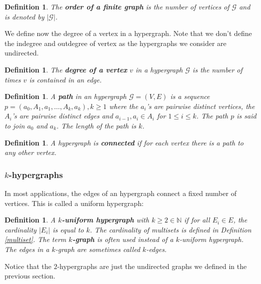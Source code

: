 \documentclass[a4paper,11pt]{report}
\newtheorem{definition}[theorem]{Definition}
\newcommand{\N}{{\mathbb N}}
\newcommand{\hgraf}{\mathcal{G}}
\begin{document}
\begin{definition}
  The \textbf{order of a finite graph \hgraf} is the number of vertices of $\hgraf$ 
  and is denoted by $|\hgraf|$.
\end{definition}
We define now the degree of a vertex in a hypergraph. Note that we don't define 
the indegree and outdegree of vertex as the hypergraphs we consider are 
undirected.
\begin{definition}
The \textbf{degree of a vertex} $v$ in a hypergraph $\hgraf$ is the number of 
times $v$ is contained in an edge.
\end{definition}

\begin{definition}
A \textbf{path} in an hypergraph $\hgraf = (V,E)$ is a sequence $p = (a_0, A_1, a_1, \ldots, A_k, a_k), k \geq 1$ where the
$a_i$'s are pairwise distinct vertices, the $A_i$'s are pairwise distinct
edges and ${a_{i-1}, a_i} \in A_i$ for $1 \leq i \leq k$. The path $p$ is said 
to join $a_0$ and $a_k$. The length of the path is $k$.
\end{definition}

\begin{definition}
A hypergraph is \textbf{connected} if for each vertex there is a path to any 
other vertex.

\end{definition}
\subsubsection{$k$-hypergraphs}
In most applications, the edges of an hypergraph connect a fixed number of 
vertices. This is called a uniform hypergraph:

\begin{definition}
  A \textbf{$k$-uniform hypergraph} with $k \geq 2 \in \N$ if for all $E_i \in E$, 
  the cardinality $|E_i|$ is equal to $k$. The cardinality of multisets is defined in Definition \ref{multiset}.
  The term \textbf{$k$-graph} is often used 
  instead of a $k$-uniform hypergraph. The edges in a $k$-graph are sometimes 
  called $k$-edges.
\end{definition}

Notice that the $2$-hypergraphs are just the undirected graphs we defined in the previous 
section.
\end{document}
